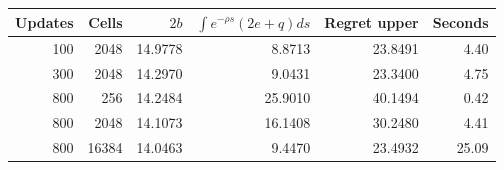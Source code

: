 \begin{tabular}{rrrrrr}
\toprule
Updates & Cells & $2b$ & $\int e^{-\rho s}(2e+q)ds$ & Regret upper & Seconds \\
\midrule
100 & 2048 & 14.9778 & 8.8713 & 23.8491 & 4.40 \\
300 & 2048 & 14.2970 & 9.0431 & 23.3400 & 4.75 \\
800 & 256 & 14.2484 & 25.9010 & 40.1494 & 0.42 \\
800 & 2048 & 14.1073 & 16.1408 & 30.2480 & 4.41 \\
800 & 16384 & 14.0463 & 9.4470 & 23.4932 & 25.09 \\
\bottomrule
\end{tabular}
